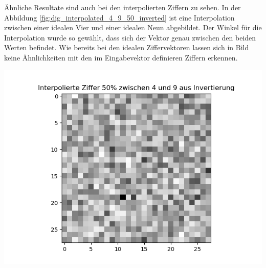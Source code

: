 \documentclass[Interploate_hadwritten_Digits.tex]{subfiles}
\begin{document}
	Ähnliche Resultate sind auch bei den interpolierten Ziffern zu sehen. In der Abbildung \ref{fig:dig_interpolated_4_9_50_inverted} ist eine Interpolation zwischen einer idealen Vier und einer idealen Neun abgebildet. Der Winkel für die Interpolation wurde so gewählt, dass sich der Vektor genau zwischen den beiden Werten befindet. Wie bereits bei den idealen Ziffervektoren lassen sich in Bild keine Ähnlichkeiten mit den im Eingabevektor definieren Ziffern erkennen.
	\begin{Figure}
		\centering
		\includegraphics[width=\linewidth]{img/results/interpolated_4_9_50_inverted.png}
		\label{fig:dig_interpolated_4_9_50_inverted}
	\end{Figure}
	
\end{document}

